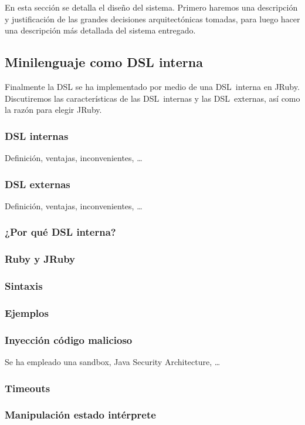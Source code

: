 En esta sección se detalla el diseño del sistema. Primero haremos una
descripción y justificación de las grandes decisiones arquitectónicas
tomadas, para luego hacer una descripción más detallada del sistema
entregado.

\subsection{Minilenguaje como DSL interna}
Finalmente la DSL se ha implementado por medio de una DSL~interna en
JRuby. Discutiremos las características de las DSL~internas y las
DSL~externas, así como la razón para elegir JRuby.
\subsubsection{DSL internas}
Definición, ventajas, inconvenientes, \ldots{}
\subsubsection{DSL externas}
Definición, ventajas, inconvenientes, \ldots{}
\subsubsection{¿Por qué DSL interna?}
\subsubsection{Ruby y JRuby}
\subsubsection{Sintaxis}
\subsubsection{Ejemplos}

\subsubsection{Inyección código malicioso}
Se ha empleado una sandbox, Java Security Architecture, \ldots{}
\subsubsection{Timeouts}
\subsubsection{Manipulación estado intérprete}

